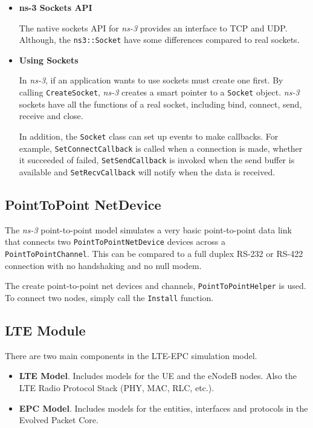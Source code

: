 \begin{itemize}
  \item \textbf{ns-3 Sockets API} 
  
  The native sockets API for \textit{ns-3} provides an interface 
  to TCP and UDP. Although, the \texttt{ns3::Socket} have some differences compared to
  real sockets. 

  \item \textbf{Using Sockets} 

  In \textit{ns-3}, if an application wants to use sockets must create one first. By 
  calling \texttt{CreateSocket}, \textit{ns-3} creates a smart pointer to a \texttt{Socket} object.
  \textit{ns-3} sockets have all the functions of a real socket, including bind, connect, send, receive
  and close.

  In addition, the \texttt{Socket} class can set up events to make callbacks. For example, 
  \texttt{SetConnectCallback} is called when a connection is made, whether it succeeded of 
  failed, \texttt{SetSendCallback} is invoked when the send buffer is available
  and \texttt{SetRecvCallback} will notify when the data is received.
\end{itemize}

\subsection{PointToPoint NetDevice}
The \textit{ns-3} point-to-point model simulates a very basic point-to-point data link that connects 
two \texttt{PointToPointNetDevice} devices across a \texttt{PointToPointChannel}. This can be compared to a 
full duplex RS-232 or RS-422 connection with no handshaking and no null modem.

The create point-to-point net devices and channels, \texttt{PointToPointHelper} is used. To
connect two nodes, simply call the \texttt{Install} function.

\subsection{LTE Module}
There are two main components in the LTE-EPC simulation model.

\begin{itemize}[topsep=0pt, noitemsep]
  \item \textbf{LTE Model}. Includes models for the UE and the eNodeB nodes. Also the LTE Radio Protocol
  Stack (PHY, MAC, RLC, etc.).

  \item \textbf{EPC Model}. Includes models for the entities, interfaces and protocols in the Evolved Packet Core.
\end{itemize}

